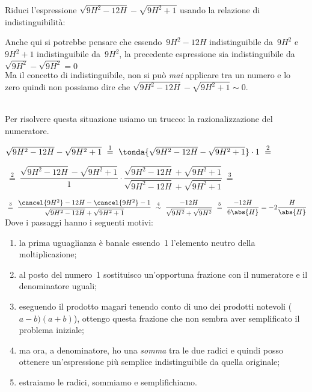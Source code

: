 
\begin{esempio}
Riduci l'espressione 
\(\sqrt{9H^2 -12H} - \sqrt{9H^2 +1}\)
usando la relazione di indistinguibilità: 

\begin{osservazione}
 Anche qui si potrebbe pensare che essendo~\(9H^2 -12H\) indistinguibile 
da~\(9H^2\) e~\(9H^2 +1\) indistinguibile da~\(9H^2\), la precedente 
espressione sia indistinguibile da \\
\(\sqrt{9H^2} - \sqrt{9H^2} = 0\)\\
Ma il concetto di indistinguibile, non si può \emph{mai} 
applicare tra un numero e lo zero quindi non possiamo dire che 
\(\sqrt{9H^2 -12H} - \sqrt{9H^2 +1} \sim 0\).
\end{osservazione}\\[1em]
Per risolvere questa situazione usiamo un trucco: la razionalizzazione del 
numeratore.

\(\sqrt{9H^2 -12H} - \sqrt{9H^2 +1}
~ \stackrel{1}{=} ~
   \tonda{\sqrt{9H^2 -12H} - \sqrt{9H^2 +1}} \cdot 1 
~ \stackrel{2}{=} ~\)

\(~ \stackrel{2}{=} ~\dfrac{\sqrt{9H^2 -12H}-\sqrt{9H^2 +1}}{1} \cdot 
   \dfrac{\sqrt{9H^2 -12H}+\sqrt{9H^2 +1}}{\sqrt{9H^2 -12H}+\sqrt{9H^2+1}}
~ \stackrel{3}{=} ~\)

\(~ \stackrel{3}{=} ~
   \dfrac{\cancel{9H^2} -12H - \cancel{9H^2} -1}
         {\sqrt{9H^2 -12H}+\sqrt{9H^2+1}}
~ \stackrel{4}{\sim} ~
   \dfrac{-12H}{\sqrt{9H^2} + \sqrt{9H^2}}
~ \stackrel{5}{=} ~
   \dfrac{-12H}{6\abs{H}} = -2\dfrac{H}{\abs{H}}\)\\

Dove i passaggi hanno i seguenti motivi:
\begin{enumerate} [nosep]
 \item la prima uguaglianza è banale essendo~1 l'elemento 
neutro della moltiplicazione; 
 \item al posto del numero~1 sostituisco un'opportuna frazione con 
il numeratore e il denominatore uguali; 
 \item eseguendo il prodotto magari tenendo conto di uno 
dei prodotti notevoli (\(a-b)(a+b)\)), ottengo questa frazione che
non sembra aver semplificato il problema iniziale;
 \item ma ora, a denominatore, ho una \emph{somma} tra le due radici 
e quindi posso ottenere un'espressione più semplice 
indistinguibile da quella originale;
 \item estraiamo le radici, sommiamo e semplifichiamo.
\end{enumerate}
\end{esempio}

